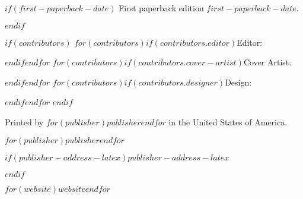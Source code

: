 \begin{singlespacing}
$if(first-paperback-date)$
\noindent  First paperback edition $first-paperback-date$. \par
\vspace{0.4cm}
$endif$

$if(contributors)$
  $for(contributors)$$if(contributors.editor)$\noindent Editor: \editor \par$endif$$endfor$
  $for(contributors)$$if(contributors.cover-artist)$\noindent Cover Artist: \coverartist \par$endif$$endfor$
  $for(contributors)$$if(contributors.designer)$\noindent Design: \designer \par$endif$$endfor$
\vspace{0.4cm}
$endif$

\noindent Printed by $for(publisher)$$publisher$$endfor$ in the United States of America. \par
\vspace{0.4cm}

$for(publisher)$\noindent $publisher$$endfor$ \par
$if(publisher-address-latex)$\noindent $publisher-address-latex$ \par $endif$

\vspace{0.4cm}

$for(website)$\noindent $website$$endfor$

\end{singlespacing}

\vspace*{\fill}
